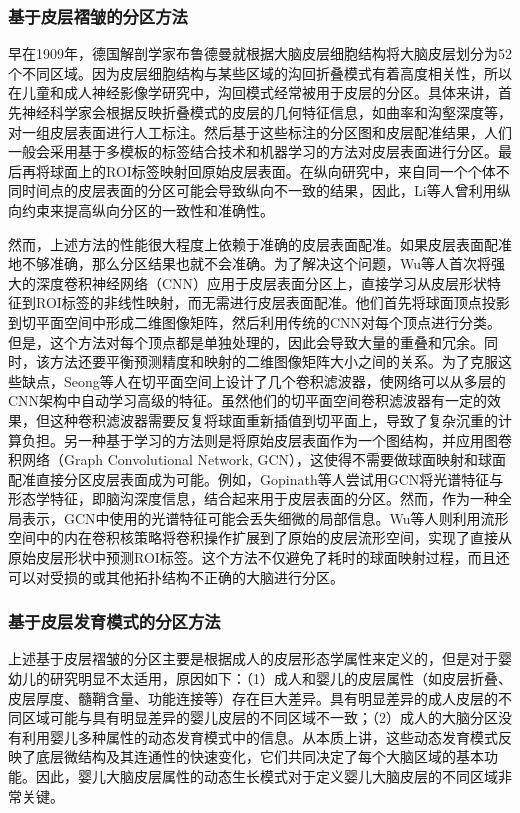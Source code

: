\subsubsection{基于皮层褶皱的分区方法}
早在1909年，德国解剖学家布鲁德曼就根据大脑皮层细胞结构将大脑皮层划分为52个不同区域。因为皮层细胞结构与某些区域的沟回折叠模式有着高度相关性，所以在儿童和成人神经影像学研究中，沟回模式经常被用于皮层的分区。具体来讲，首先神经科学家会根据反映折叠模式的皮层的几何特征信息，如曲率和沟壑深度等，对一组皮层表面进行人工标注。然后基于这些标注的分区图和皮层配准结果，人们一般会采用基于多模板的标签结合技术和机器学习的方法对皮层表面进行分区。最后再将球面上的ROI标签映射回原始皮层表面\cite{yeo2009spherical,desikan2006automated}。在纵向研究中，来自同一个个体不同时间点的皮层表面的分区可能会导致纵向不一致的结果，因此，Li等人\cite{li2014simultaneous}曾利用纵向约束来提高纵向分区的一致性和准确性。

然而，上述方法的性能很大程度上依赖于准确的皮层表面配准。如果皮层表面配准地不够准确，那么分区结果也就不会准确。为了解决这个问题，Wu等人\cite{wu2018registration}首次将强大的深度卷积神经网络（CNN）应用于皮层表面分区上，直接学习从皮层形状特征到ROI标签的非线性映射，而无需进行皮层表面配准。他们首先将球面顶点投影到切平面空间中形成二维图像矩阵，然后利用传统的CNN对每个顶点进行分类。但是，这个方法对每个顶点都是单独处理的，因此会导致大量的重叠和冗余。同时，该方法还要平衡预测精度和映射的二维图像矩阵大小之间的关系。为了克服这些缺点，Seong等人\cite{seong2018geometric}在切平面空间上设计了几个卷积滤波器，使网络可以从多层的CNN架构中自动学习高级的特征。虽然他们的切平面空间卷积滤波器有一定的效果，但这种卷积滤波器需要反复将球面重新插值到切平面上，导致了复杂沉重的计算负担。另一种基于学习的方法则是将原始皮层表面作为一个图结构，并应用图卷积网络（Graph Convolutional Network, GCN）\cite{monti2017geometric}，这使得不需要做球面映射和球面配准直接分区皮层表面成为可能。例如，Gopinath等人\cite{gopinath2019graph}尝试用GCN将光谱特征与形态学特征，即脑沟深度信息，结合起来用于皮层表面的分区。然而，作为一种全局表示，GCN中使用的光谱特征可能会丢失细微的局部信息。Wu等人\cite{wu2019intrinsic}则利用流形空间中的内在卷积核策略将卷积操作扩展到了原始的皮层流形空间，实现了直接从原始皮层形状中预测ROI标签。这个方法不仅避免了耗时的球面映射过程，而且还可以对受损的或其他拓扑结构不正确的大脑进行分区。


\subsubsection{基于皮层发育模式的分区方法}
上述基于皮层褶皱的分区主要是根据成人的皮层形态学属性来定义的，但是对于婴幼儿的研究明显不太适用，原因如下：（1）成人和婴儿的皮层属性（如皮层折叠、皮层厚度、髓鞘含量、功能连接等）存在巨大差异。具有明显差异的成人皮层的不同区域可能与具有明显差异的婴儿皮层的不同区域不一致；（2）成人的大脑分区没有利用婴儿多种属性的动态发育模式中的信息。从本质上讲，这些动态发育模式反映了底层微结构及其连通性的快速变化，它们共同决定了每个大脑区域的基本功能。因此，婴儿大脑皮层属性的动态生长模式对于定义婴儿大脑皮层的不同区域非常关键。

